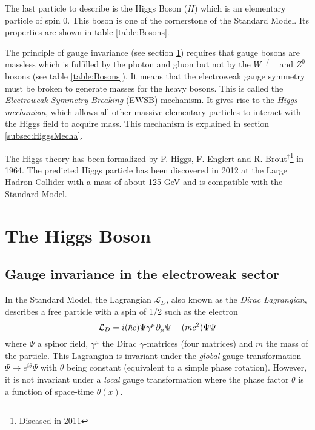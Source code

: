 The last particle to describe is the Higgs Boson ($H$) which is an elementary particle of spin 0. This boson is one of the cornerstone of the Standard Model. Its properties are shown in table \ref{table:Bosons}.

The principle of gauge invariance (see section \ref{sec:HiggsTheo}) requires that gauge bosons are massless which is fulfilled by the photon and gluon but not by the $W^{+/-}$ and $Z^0$ bosons (see table \ref{table:Bosons}). It means that the electroweak gauge symmetry must be broken to generate masses for the heavy bosons. This is called the \textit{Electroweak Symmetry Breaking} (EWSB) mechanism. It gives rise to the \textit{Higgs mechanism}, which allows all other massive elementary particles to interact with the Higgs field to acquire mass. This mechanism is explained in section \ref{subsec:HiggsMecha}.

The Higgs theory \cite{Higgs:1964pj, Englert:1964et} has been formalized by P. Higgs, F. Englert and R. Brout$^\dagger$\footnote{Diseased in 2011} in 1964. The predicted Higgs particle has been discovered in 2012 at the Large Hadron Collider \cite{Aad:2012tfa, Chatrchyan:2012xdj} with a mass of about 125 GeV and is compatible with the Standard Model.

\section{The Higgs Boson}
\label{sec:HiggsTheo}

\subsection{Gauge invariance in the electroweak sector}

In the Standard Model, the Lagrangian $\mathcal{L}_{D}$, also known as the \textit{Dirac Lagrangian}, describes a free particle with a spin of 1/2 such as the electron \cite{Griffiths:343277}
\begin{equation}
  \mathcal{L}_{D} = i(\hbar c)\overline{\rm \Psi}\gamma^{\mu}\partial_{\mu}\Psi - (mc^2)\overline{\rm \Psi}\Psi
\end{equation}
where $\Psi$ a spinor field, $\gamma^{\mu}$ the Dirac $\gamma$-matrices (four matrices) \cite{Peskin:1995ev} and $m$ the mass of the particle. This Lagrangian is invariant under the \textit{global} gauge transformation $\Psi \rightarrow e^{i\theta}\Psi$ with $\theta$ being constant (equivalent to a simple phase rotation). However, it is not invariant under a \textit{local} gauge transformation where the phase factor $\theta$ is a function of space-time $\theta(x)$.

